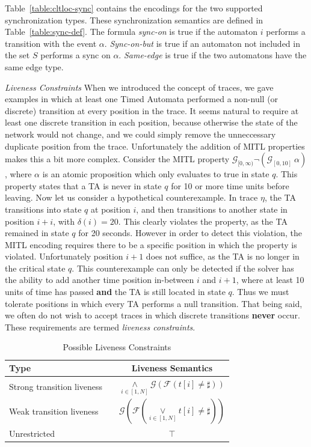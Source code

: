 \documentclass[a4paper,11pt]{report}
\theoremstyle{definition}
\begin{document}
Table~\ref{table:cltloc-sync} contains the encodings for the two supported
synchronization types. These synchronization semantics are defined in
Table~\ref{table:sync-def}. The formula \emph{sync-on} is true if the automaton
$i$ performs a transition with the event $\alpha$. \emph{Sync-on-but} is true if
an automaton not included in the set $S$ performs a sync on $\alpha$.
\emph{Same-edge} is true if the two automatons have the same edge type.


\emph{Liveness Constraints} When we introduced the concept of traces, we gave
examples in which at least one Timed Automata performed a non-null (or discrete)
transition at every position in the trace. It seems natural to require at least
one discrete transition in each position, because otherwise the state of the
network would not change, and we could simply remove the unneccessary duplicate
position from the trace. Unfortunately the addition of MITL properties makes
this a bit more complex. Consider the MITL property
$\mathcal{G}_{[0,\infty)} \neg(\mathcal{G}_{[0,10]}\ \alpha)$, where $\alpha$ is
an atomic proposition which only evaluates to true in state $q$. This property
states that a TA is never in state $q$ for 10 or more time units before leaving.
Now let us consider a hypothetical counterexample. In trace $\eta$, the TA
transitions into state $q$ at position $i$, and then transitions to another
state in position $i{+}i$, with $\delta(i)=20$. This clearly violates the
property, as the TA remained in state $q$ for 20 seconds. However in order to
detect this violation, the MITL encoding requires there to be a specific
position in which the property is violated. Unfortunately position $i{+}1$ does
not suffice, as the TA is no longer in the critical state $q$. This
counterexample can only be detected if the solver has the ability to add another
time position in-between $i$ and $i{+}1$, where at least 10 units of time has
passed \textbf{and} the TA is still located in state $q$. Thus we must tolerate
positions in which every TA performs a null transition. That being said, we
often do not wish to accept traces in which discrete transitions \textbf{never}
occur. These requirements are termed \emph{liveness constraints}.


\begin{table}[h]
  \centering
  \begin{tabular}{p{} p{} c}
    \toprule
    \textbf{Type} && \textbf{Liveness Semantics} \\
    \midrule
    Strong transition liveness &&
                                 $\underset{i \in [1,N]}{\land} \mathcal{G}(\mathcal{F}(t[i] \neq \sharp))$
    \\
    \midrule
    Weak transition liveness && $\mathcal{G}(\mathcal{F}(\underset{i \in [1,N]}{\lor} t[i] \neq \sharp))$ \\
    \midrule
    Unrestricted && $\top$ \\
    \bottomrule
  \end{tabular}
  \caption{Possible Liveness Constraints}
  \label{table:liveness-def}
\end{table}
\end{document}
